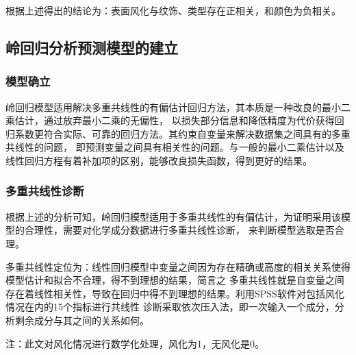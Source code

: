 \documentclass[UTF8]{ctexart}
\begin{document}
根据上述得出的结论为：表面风化与纹饰、类型存在正相关，和颜色为负相关。

\subsection{岭回归分析预测模型的建立}
\subsubsection{模型确立}
岭回归模型适用解决多重共线性的有偏估计回归方法，其本质是一种改良的最小二乘估计，通过放弃最小二乘的无偏性， 
以损失部分信息和降低精度为代价获得回归系数更符合实际、可靠的回归方法。其约束自变量来解决数据集之间具有的多重共线性的问题，
即预测变量之间具有相关性的问题。与一般的最小二乘估计以及线性回归方程有着补加项的区别，能够改良损失函数，得到更好的结果。

\subsubsection{多重共线性诊断}
根据上述的分析可知，岭回归模型适用于多重共线性的有偏估计，为证明采用该模型的合理性，需要对化学成分数据进行多重共线性诊断，
来判断模型选取是否合理。

多重共线性定位为：线性回归模型中变量之间因为存在精确或高度的相关关系使得模型估计和拟合不合理，得不到理想的结果，简言之
多重共线性就是自变量之间存在着线性相关性，导致在回归中得不到理想的结果。利用SPSS软件对包括风化情况在内的15个指标进行共线性
诊断采取依次压入法，即一次输入一个成分，分析剩余成分与其之间的关系如何。

注：此文对风化情况进行数学化处理，风化为1，无风化是0。
\end{document}
